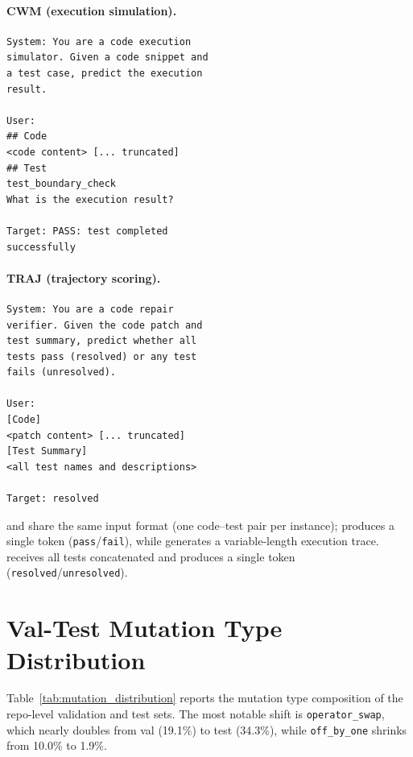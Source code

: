 \paragraph{CWM (execution simulation).}
{\footnotesize\begin{verbatim}
System: You are a code execution
simulator. Given a code snippet and
a test case, predict the execution
result.

User:
## Code
<code content> [... truncated]
## Test
test_boundary_check
What is the execution result?

Target: PASS: test completed
successfully
\end{verbatim}}

\paragraph{TRAJ (trajectory scoring).}
{\footnotesize\begin{verbatim}
System: You are a code repair
verifier. Given the code patch and
test summary, predict whether all
tests pass (resolved) or any test
fails (unresolved).

User:
[Code]
<patch content> [... truncated]
[Test Summary]
<all test names and descriptions>

Target: resolved
\end{verbatim}}

\cls{} and \cwm{} share the same input format (one code--test pair per instance); \cls{} produces a single token (\texttt{pass}/\texttt{fail}), while \cwm{} generates a variable-length execution trace. \traj{} receives all tests concatenated and produces a single token (\texttt{resolved}/\texttt{unresolved}).


\section{Val-Test Mutation Type Distribution}
\label{app:mutation_distribution}

Table~\ref{tab:mutation_distribution} reports the mutation type composition of the repo-level validation and test sets. The most notable shift is \texttt{operator\_swap}, which nearly doubles from val (19.1\%) to test (34.3\%), while \texttt{off\_by\_one} shrinks from 10.0\% to 1.9\%.

